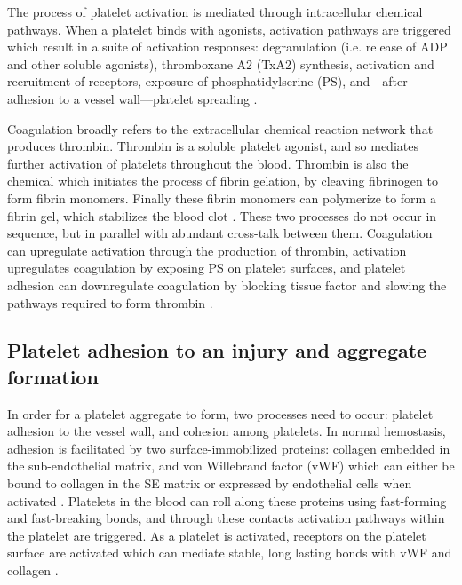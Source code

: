 The process of platelet activation is mediated through
intracellular chemical pathways. When a platelet binds with agonists,
activation pathways are triggered which result in a suite of
activation responses: degranulation (i.e. release of ADP and other
soluble agonists), thromboxane A2 (TxA2) synthesis, activation and
recruitment of  receptors, exposure of
phosphatidylserine (PS), and---after adhesion to a vessel
wall---platelet spreading \cite{Bye2016}.

Coagulation broadly refers to the extracellular chemical reaction
network that produces thrombin. Thrombin is a soluble platelet
agonist, and so mediates further activation of platelets throughout
the blood. Thrombin is also the chemical which initiates the process
of fibrin gelation, by cleaving fibrinogen to form fibrin
monomers. Finally these fibrin monomers can polymerize to form a
fibrin gel, which stabilizes the blood clot \cite{Fogelson2015}. These
two processes do not occur in sequence, but in parallel with abundant
cross-talk between them. Coagulation can upregulate activation through
the production of thrombin, activation upregulates coagulation by
exposing PS on platelet surfaces, and platelet adhesion can
downregulate coagulation by blocking tissue factor and slowing the
pathways required to form thrombin \cite{Kuharsky2001}. 


\subsection{Platelet adhesion to an injury and aggregate formation}
\label{sec:platelet-adhesion}

In order for a platelet aggregate to form, two processes need to
occur: platelet adhesion to the vessel wall, and cohesion among
platelets. In normal hemostasis, adhesion is facilitated by two
surface-immobilized proteins: collagen embedded in the sub-endothelial
matrix, and von Willebrand factor (vWF) which can either be bound to
collagen in the SE matrix or expressed by endothelial cells when
activated \cite{Fogelson2015}. Platelets in the blood can roll along
these proteins using fast-forming and fast-breaking bonds, and through
these contacts activation pathways within the platelet are
triggered. As a platelet is activated, receptors on the platelet
surface are activated which can mediate stable, long lasting bonds
with vWF and collagen \cite{Bye2016,Li2010,Fogelson2015,Qiu2015}. 
		
